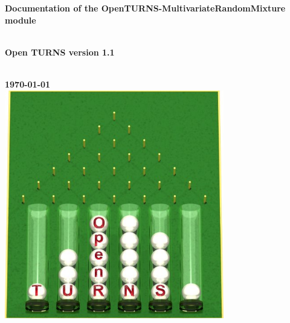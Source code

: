 \vspace*{2cm}

\begin{center}
  {\huge \bf Documentation of the OpenTURNS-MultivariateRandomMixture module}
  \Large{\strut\\[2em]\bf Open TURNS version 1.1}\\
  \vspace*{1cm}
  {\bf \Large \today }\\[2cm]
  \includegraphics[height=10cm]{logoOpenTURNS.jpg}
\end{center}

